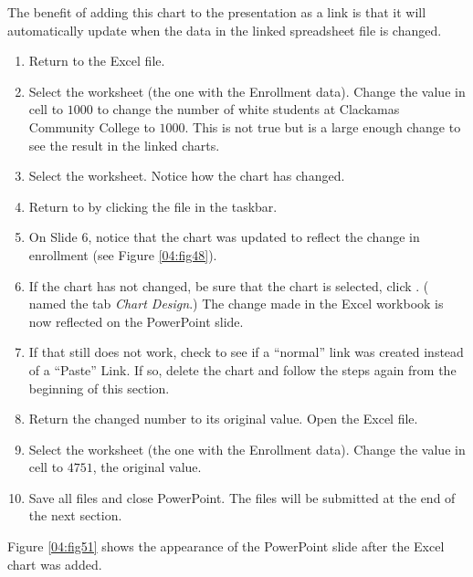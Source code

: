 The benefit of adding this chart to the presentation as a link is that it will automatically update when the data in the linked spreadsheet file is changed.

\begin{enumerate}
	\item Return to the  Excel file.
	\item Select the  worksheet (the one with the Enrollment data). Change the value in cell  to $ 1000 $ to change the number of white students at Clackamas Community College to $ 1000 $. This is not true but is a large enough change to see the result in the linked charts.
	\item Select the  worksheet. Notice how the chart has changed.
	\item Return to  by clicking the file in the taskbar.
	\item On Slide $ 6 $, notice that the chart was updated to reflect the change in enrollment (see Figure \ref{04:fig48}).
	\item If the chart has not changed, be sure that the chart is selected, click . ( named the tab \textit{Chart Design}.) The change made in the Excel workbook is now reflected on the PowerPoint slide.
	\item If that still does not work, check to see if a ``normal'' link was created instead of a ``Paste'' Link. If so, delete the chart and follow the steps again from the beginning of this section.
	\item Return the changed number to its original value. Open the   Excel file.
	\item Select the  worksheet (the one with the Enrollment data). Change the value in cell  to $ 4751 $, the original value.
	\item Save all files and close PowerPoint. The files will be submitted at the end of the next section.
\end{enumerate}

Figure \ref{04:fig51} shows the appearance of the PowerPoint slide after the Excel chart was added. 

